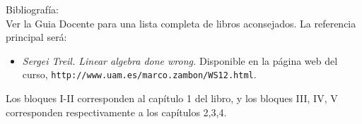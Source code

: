 \documentclass[12pt,a4paper]{amsart}
\begin{document}
\noindent\hrulefill{}  

 \noindent
{\sffamily Bibliograf\'ia:} \\
Ver la Guia Docente para una lista completa de libros aconsejados. La referencia principal ser\'a:


\begin{itemize}
\item \emph{Sergei Treil. Linear algebra done wrong.} Disponible en la p\'agina web del curso, \texttt{http://www.uam.es/marco.zambon/WS12.html}. \end{itemize}

  
Los bloques I-II corresponden al cap\'itulo 1 del libro,  y los bloques III, IV, V corresponden respectivamente a los cap\'itulos 2,3,4.

  

  
  
\end{document}
